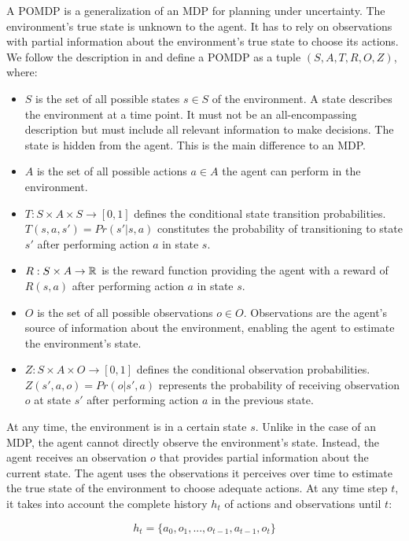 A POMDP is a generalization of an MDP for planning under uncertainty. The environment's true state is unknown to the agent. It has to rely on observations with partial information about the environment's true state to choose its actions. We follow the description in \cite{pomdp-definition} and define a POMDP as a tuple $(S, A, T, R, O, Z)$, where:
\begin{itemize}
    \item $S$ is the set of all possible states $s \in S$ of the environment. A state describes the environment at a time point. It must not be an all-encompassing description but must include all relevant information to make decisions. The state is hidden from the agent. This is the main difference to an MDP.
    \item $A$ is the set of all possible actions $a \in A$ the agent can perform in the environment.
    \item $T : S \times A \times S \rightarrow [0,1]$ defines the conditional state transition probabilities. $T(s,a,s') = Pr(s' | s, a)$ constitutes the probability of transitioning to state $s'$ after performing action $a$ in state $s$.
    \item $R : S \times A \rightarrow \mathbb{R}$ is the reward function providing the agent with a reward of $R(s,a)$ after performing action $a$ in state $s$.
    \item $O$ is the set of all possible observations $o \in O$. Observations are the agent's source of information about the environment, enabling the agent to estimate the environment's state.
    \item $Z : S \times A \times O \rightarrow [0,1]$ defines the conditional observation probabilities. $Z(s', a, o) = Pr(o | s', a)$ represents the probability of receiving observation $o$ at state $s'$ after performing action $a$ in the previous state. 
\end{itemize}

\noindent
At any time, the environment is in a certain state $s$. Unlike in the case of an MDP, the agent cannot directly observe the environment's state. Instead, the agent receives an observation $o$ that provides partial information about the current state. The agent uses the observations it perceives over time to estimate the true state of the environment to choose adequate actions. At any time step $t$, it takes into account the complete history $h_t$ of actions and observations until $t$:

\begin{equation}
    h_t = \{a_0,o_1,...,o_{t-1},a_{t-1},o_t\}
\end{equation}


